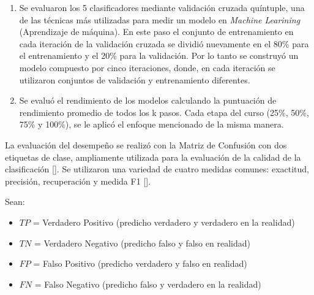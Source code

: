 \begin{enumerate}
    \item Se evaluaron los 5 clasificadores mediante validación cruzada quíntuple, una de las técnicas más utilizadas para medir un modelo en \textit{Machine Learining} (Aprendizaje de máquina). En este paso el conjunto de entrenamiento en cada iteración de la validación cruzada se dividió nuevamente en el 80\% para el entrenamiento y el 20\% para la validación. Por lo tanto se construyó un modelo compuesto por cinco iteraciones, donde, en cada iteración se utilizaron conjuntos de validación y entrenamiento diferentes.
    \item Se evaluó el rendimiento de los modelos calculando la puntuación de rendimiento promedio de todos los k pasos. Cada etapa del curso (25\%, 50\%, 75\% y 100\%), se le aplicó el enfoque mencionado de la misma manera.
\end{enumerate}

La evaluación del desempeño se realizó con la Matriz de Confusión con dos etiquetas de clase, ampliamente utilizada para la evaluación de la calidad de la clasificación [\cite{faul2019concise}]. Se utilizaron una variedad de cuatro medidas comunes: exactitud, precisión, recuperación y medida F1 [\cite{rehman2019automatic}].

Sean:  
\begin{itemize}
    \item $TP$ = Verdadero Positivo (predicho verdadero y verdadero en la realidad)
    \item $TN$ = Verdadero Negativo (predicho falso y falso en realidad)
    \item $FP$ = Falso Positivo (predicho verdadero y falso en realidad)
    \item $FN$ = Falso Negativo (predicho falso y verdadero en la realidad)
\end{itemize}

